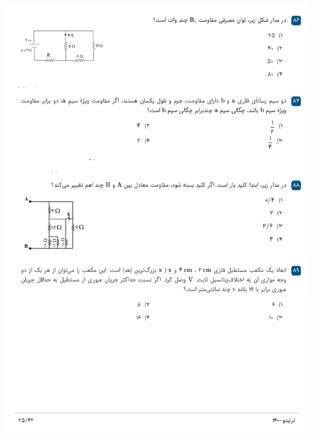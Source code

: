 \documentclass{book}
\begin{document}
\includegraphics[width=\textwidth]{"pages/25"}
\end{document}
